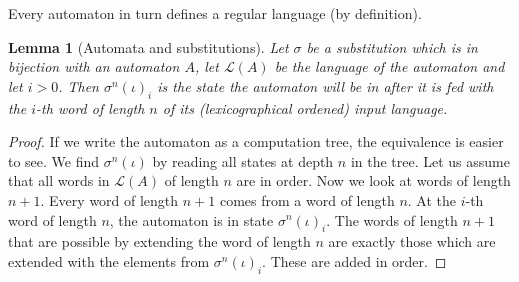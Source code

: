 \documentclass{article}
\newtheorem{lemma}[theorem]{Lemma}
\theoremstyle{definition}
\begin{document}
Every automaton in turn defines a regular language (by definition).
\begin{lemma}[Automata and substitutions] \label{lem:automata_substitutions}
Let $\sigma$ be a substitution which is in bijection with an automaton $A$,
let $\mathcal{L}(A)$ be the language of the automaton and let $i > 0$. Then 
$\sigma^n(\iota)_i$ is the state the automaton will be in after it is fed with 
the $i$-th word of length $n$ of its (lexicographical ordened) input language.
\end{lemma}

\begin{proof}
If we write the automaton as a computation tree, the equivalence is easier to 
see. We find $\sigma^n(\iota)$ by reading all states at depth $n$ in the tree. 
Let us assume that all words in $\mathcal{L}(A)$ of length $n$ are in order.
Now we look at words of length $n + 1$. Every word of length $n + 1$ comes from
a word of length $n$. At the $i$-th word of length $n$, the automaton is in 
state $\sigma^n(\iota)_i$. The words of length $n + 1$ that are possible by 
extending the word of length $n$ are exactly those which are extended with the 
elements from $\sigma^n(\iota)_i$. These are added in order.
\end{proof}
\end{document}
